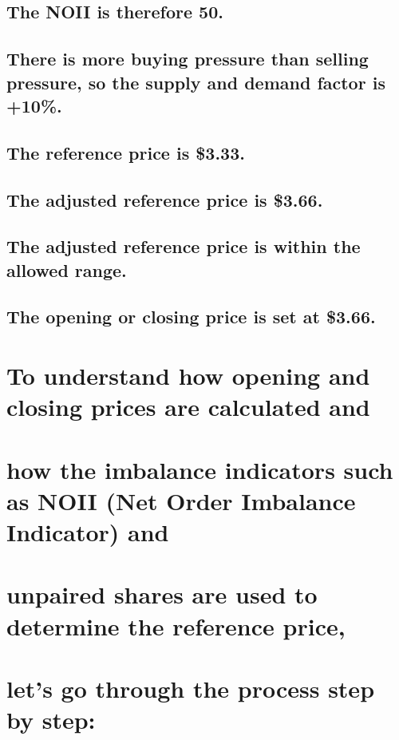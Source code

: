 \documentclass[11pt]{article}
\begin{document}
\subsection{The NOII is therefore 50.}
\label{sec:orgd8f8b02}
\subsection{There is more buying pressure than selling pressure, so the supply and demand factor is +10\%.}
\label{sec:orgb5be706}
\subsection{The reference price is \$3.33.}
\label{sec:orgf3560ab}
\subsection{The adjusted reference price is \$3.66.}
\label{sec:orgeac8300}
\subsection{The adjusted reference price is within the allowed range.}
\label{sec:orga207f88}
\subsection{The opening or closing price is set at \$3.66.}
\label{sec:org69f0040}


\section{To understand how opening and closing prices are calculated and}
\label{sec:orgf43b766}
\section{how the imbalance indicators such as NOII (Net Order Imbalance Indicator) and}
\label{sec:org8f9ebbe}
\section{unpaired shares are used to determine the reference price,}
\label{sec:org8bc2056}
\section{let's go through the process step by step:}
\label{sec:org27c97b5}
\end{document}
